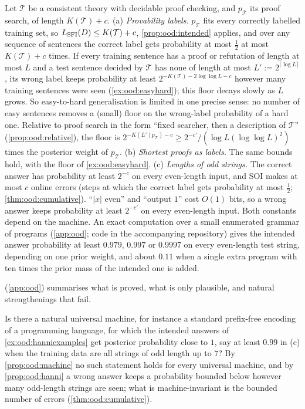 \begin{example}\label{ex:ood:hanniexamples}
Let $\mathcal T$ be a consistent theory with decidable proof checking, and $p_{\mathcal T}$ its proof search, of length $K(\mathcal T)+c$.
(a) \emph{Provability labels.} $p_{\mathcal T}$ fits every correctly labelled training set, so $L_{\mathrm{SFI}}(D)\le K(\mathcal T)+c$, \cref{prop:ood:intended} applies, and over any sequence of sentences the correct label gets probability at most $\frac12$ at most $K(\mathcal T)+c$ times. If every training sentence has a proof or refutation of length at most $L$ and a test sentence decided by $\mathcal T$ has none of length at most $L':=2^{\lceil\log L\rceil}$, its wrong label keeps probability at least $2^{-K(\mathcal T)-2\log\log L-c}$ however many training sentences were seen (\cref{ex:ood:easyhard}); this floor decays slowly as $L$ grows. So easy-to-hard generalisation is limited in one precise sense: no number of easy sentences removes a (small) floor on the wrong-label probability of a hard one. Relative to proof search in the form ``fixed searcher, then a description of $\mathcal T$'' (\cref{prop:ood:relative}), the floor is $2^{-K(L'\mid p_{\mathcal T})-c}\ge2^{-c'}/(\log L(\log\log L)^2)$ times the posterior weight of $p_{\mathcal T}$.
(b) \emph{Shortest proofs as labels.} The same bounds hold, with the floor of \cref{ex:ood:easyhard}.
(c) \emph{Lengths of odd strings.} The correct answer has probability at least $2^{-c}$ on every even-length input, and SOI makes at most $c$ online errors (steps at which the correct label gets probability at most $\frac12$; \cref{thm:ood:cumulative}). ``$|x|$ even'' and ``output $1$'' cost $O(1)$ bits, so a wrong answer keeps probability at least $2^{-c'}$ on every even-length input. Both constants depend on the machine. An exact computation over a small enumerated grammar of programs (\cref{app:ood}; code in the accompanying repository) gives the intended answer probability at least $0.979$, $0.997$ or $0.9997$ on every even-length test string, depending on one prior weight, and about $0.11$ when a single extra program with ten times the prior mass of the intended one is added.
\end{example}

 (\cref{app:ood}) summarises what is proved, what is only plausible, and natural strengthenings that fail.

\begin{question}\label{conj:ood:natural}
Is there a natural universal machine, for instance a standard prefix-free encoding of a programming language, for which the intended answers of \cref{ex:ood:hanniexamples} get posterior probability close to $1$, say at least $0.99$ in (c) when the training data are all strings of odd length up to $7$? By \cref{prop:ood:machine} no such statement holds for every universal machine, and by \cref{prop:ood:hanni} a wrong answer keeps a probability bounded below however many odd-length strings are seen; what is machine-invariant is the bounded number of errors (\cref{thm:ood:cumulative}).
\end{question}
